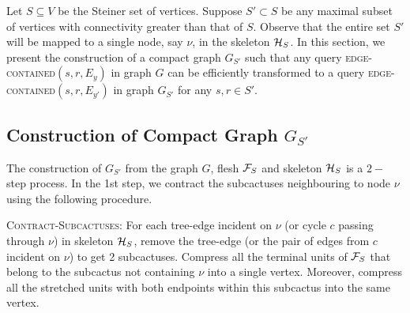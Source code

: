 \label{sec:compact-graph-section}
Let $S\subseteq V$ be the Steiner set of vertices. Suppose $S'\subset S$ be any maximal subset of vertices with connectivity greater than that of $S$.  Observe that the entire set $S'$ will be mapped to a single node, say $\nu$, in the skeleton ${\cal H}_S$. In this section, we present the construction of a compact graph $G_{S'}$ such that any query \textsc{edge-contained}$(s,r,E_y)$ in graph $G$ can be efficiently transformed to a query \textsc{edge-contained}$(s,r,E_{y'})$ in graph $G_{S'}$ for any $s,r\in S'$.
\vspace{-2mm}
\subsection{Construction of Compact Graph \texorpdfstring{$G_{S'}$}{}}\label{sec:compact-graph}


The construction of $G_{S'}$ from the graph $G$, flesh ${\cal F}_S$ and skeleton ${\cal H}_S$ is a $2-$step process. In the 1st step, we contract the subcactuses neighbouring to node $\nu$ using the following procedure.

{\textsc{Contract-Subcactuses}}: For each tree-edge incident on $\nu$ (or cycle $c$ passing through $\nu$) in skeleton ${\cal H}_S$, remove the tree-edge (or the pair of edges from $c$ incident on $\nu$) to get 2 subcactuses. Compress all the terminal units of ${\cal F}_S$ that belong to the subcactus not containing $\nu$ into a single vertex. Moreover, compress all the stretched units with both endpoints within this subcactus into the same vertex.


